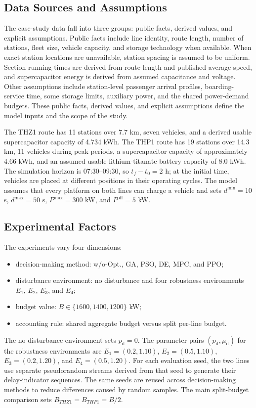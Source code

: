 \documentclass[conference]{IEEEtran}
\newcommand{\thz}{THZ1}
\newcommand{\thp}{THP1}
\begin{document}
\subsection{Data Sources and Assumptions}
The case-study data fall into three groups: public facts, derived values, and explicit assumptions. Public facts include line identity, route length, number of stations, fleet size, vehicle capacity, and storage technology when available. When exact station locations are unavailable, station spacing is assumed to be uniform. Section running times are derived from route length and published average speed, and supercapacitor energy is derived from assumed capacitance and voltage. Other assumptions include station-level passenger arrival profiles, boarding-service time, some storage limits, auxiliary power, and the shared power-demand budgets. These public facts, derived values, and explicit assumptions define the model inputs and the scope of the study.

The \thz{} route has 11 stations over 7.7 km, seven vehicles, and a derived usable supercapacitor capacity of 4.734 kWh. The \thp{} route has 19 stations over 14.3 km, 11 vehicles during peak periods, a supercapacitor capacity of approximately 4.66 kWh, and an assumed usable lithium-titanate battery capacity of 8.0 kWh. The simulation horizon is 07:30--09:30, so $t_f-t_0=2$ h; at the initial time, vehicles are placed at different positions in their operating cycles. The model assumes that every platform on both lines can charge a vehicle and sets $d^{\min}=10$ s, $d^{\max}=50$ s, $P^{\max}=300$ kW, and $P^{\mathrm{off}}=5$ kW.

\subsection{Experimental Factors}
The experiments vary four dimensions:
\begin{itemize}
    \item decision-making method: w/o-Opt., GA, PSO, DE, MPC, and PPO;
    \item disturbance environment: no disturbance and four robustness environments $E_1$, $E_2$, $E_3$, and $E_4$;
    \item budget value: $B \in \{1600,1400,1200\}$ kW;
    \item accounting rule: shared aggregate budget versus split per-line budget.
\end{itemize}
The no-disturbance environment sets $p_{\mathrm d}=0$. The parameter pairs $(p_{\mathrm d},\mu_{\mathrm d})$ for the robustness environments are $E_1=(0.2,1.10)$, $E_2=(0.5,1.10)$, $E_3=(0.2,1.20)$, and $E_4=(0.5,1.20)$. For each evaluation seed, the two lines use separate pseudorandom streams derived from that seed to generate their delay-indicator sequences. The same seeds are reused across decision-making methods to reduce differences caused by random samples. The main split-budget comparison sets $B_{\thz}=B_{\thp}=B/2$.
\end{document}
